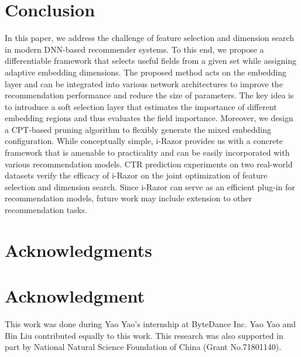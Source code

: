 \documentclass[10pt,journal,compsoc]{IEEEtran}
\begin{document}
\section{Conclusion}
\label{sec:conclusion}
In this paper, we address the challenge of feature selection and dimension search in modern DNN-based recommender systems.
To this end, we propose a differentiable framework that selects useful fields from a given set while assigning adaptive embedding dimensions.
The proposed method acts on the embedding layer and can be integrated into various network architectures to improve the recommendation performance and reduce the size of parameters.
The key idea is to introduce a soft selection layer that estimates the importance of different embedding regions and thus evaluates the field importance.
Moreover, we design a CPT-based pruning algorithm to flexibly generate the mixed embedding configuration.
While conceptually simple, i-Razor provides us with a concrete framework that is amenable to practicality and can be easily incorporated with various recommendation models. CTR prediction experiments on two real-world datasets verify the efficacy of i-Razor on the joint optimization of feature selection and dimension search.
Since i-Razor can serve as an efficient plug-in for recommendation models, future work may include extension to other recommendation tasks.

\ifCLASSOPTIONcompsoc
  \section*{Acknowledgments}
\else
  \section*{Acknowledgment}
\fi

This work was done during Yao Yao's internship at ByteDance Inc. 
Yao Yao and Bin Liu contributed equally to this work.
This research was also supported in part by National Natural Science Foundation of China (Grant No.71801140).

\ifCLASSOPTIONcaptionsoff
  \newpage
\fi



\end{document}
